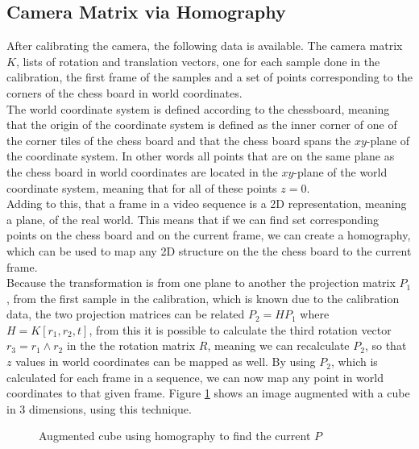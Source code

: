 \documentclass[a4paper,11pt]{article}
\begin{document}
\subsection{Camera Matrix via Homography}
After calibrating the camera, the following data is available. The camera matrix $K$, lists of rotation and translation vectors, one for each sample done in the calibration, the first frame of the samples and a set of points corresponding to the corners of the chess board in world coordinates.\\

The world coordinate system is defined according to the chessboard, meaning that the origin of the coordinate system is defined as the inner corner of one of the corner tiles of the chess board and that the chess board spans the $xy$-plane of the coordinate system. In other words all points that are on the same plane as the chess board in world coordinates are located in the $xy$-plane of the world coordinate system, meaning that for all of these points $z=0$.\\

Adding to this, that a frame in a video sequence is a 2D representation, meaning a plane, of the real world. This means that if we can find set corresponding points on the chess board and on the current frame, we can create a homography, which can be used to map any 2D structure on the the chess board to the current frame.\\

Because the transformation is from one plane to another the projection matrix $P_1$, from  the first sample in the calibration, which is known due to the calibration data, the two projection matrices can be related $P_2 = H P_1$ where $H = K[r_1,r_2,t]$, from this it is possible to calculate the third rotation vector $r_3 = r_1 \wedge r_2$ in the the rotation matrix $R$, meaning we can recalculate $P_2$, so that $z$ values in world coordinates can be mapped as well. By using $P_2$, which is calculated for each frame in a sequence, we can now map any point in world coordinates to that given frame. Figure \ref{fig:cube_from_homography} shows an image augmented with a cube in 3 dimensions, using this technique.\\

\begin{figure}[H]
\centering
\caption{Augmented cube using homography to find the current $P$}
\label{fig:cube_from_homography}
\end{figure}
\end{document}
